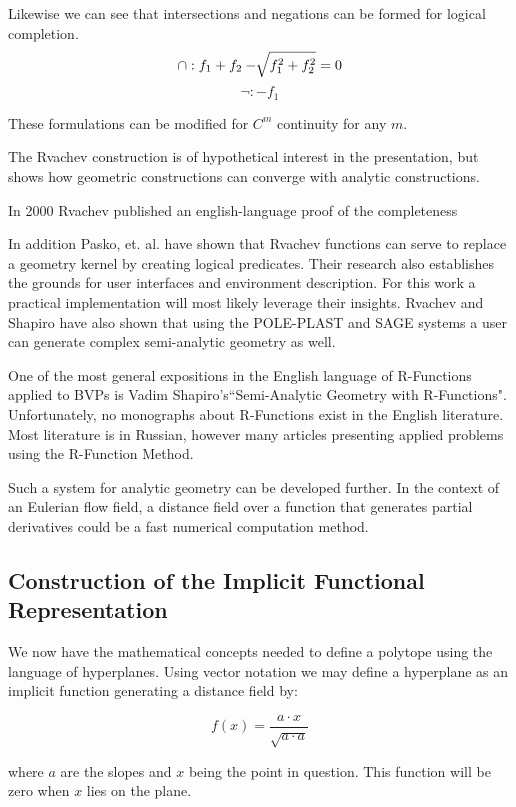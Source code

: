 Likewise we can see that intersections and negations can be formed for logical
completion.
\begin{equation*}
\cap : f_1 + f_2 - \sqrt[]{f_1^2 +f_2^2} =0 \\
\end{equation*}
\begin{equation*}
\neg : -f_1
\end{equation*}

These formulations can be modified for $C^m$ continuity for any $m$.


The Rvachev construction is of hypothetical interest in the presentation,
but shows how geometric
constructions can converge with analytic constructions.

In 2000 Rvachev published an english-language proof of the completeness
\cite{Rvachev_Sheiko_Shapiro_Tsukanov_2000}

\cite{shapiro2007semi} In addition Pasko, et. al. have shown that Rvachev
functions can serve to replace a geometry kernel by creating logical
predicates. \cite{pasko1995function} Their research also establishes the
grounds for user interfaces and environment description. For this work a
practical implementation will most likely leverage their insights.
Rvachev and Shapiro have also shown that using the POLE-PLAST and SAGE
systems a user can generate complex semi-analytic geometry
as well.\cite{rvachev2000completeness} 

One of the most general expositions in the English language of R-Functions
applied to BVPs is
Vadim Shapiro's``Semi-Analytic Geometry with R-Functions". \cite{shapiro2007semi}
Unfortunately, no monographs about R-Functions exist in the English literature.
Most literature is in Russian, however many articles presenting applied
problems using the R-Function Method. \cite{voron2010}

Such a system for analytic geometry can be developed further. In the context
of an Eulerian flow field, a distance field over a function that
generates partial derivatives could be a fast numerical computation method.




\subsection{Construction of the Implicit Functional Representation}

We now have the mathematical concepts needed to define a polytope using the
language of hyperplanes. Using vector notation we may define a hyperplane 
as an implicit function generating a distance field by:

\begin{equation}
f(x) = \frac{a \cdot x }{\sqrt{a \cdot a}}
\end{equation}

where $a$ are the slopes and $x$ being the point in question. This function
will be zero when $x$ lies on the plane.

\cite{Polyhedra}

